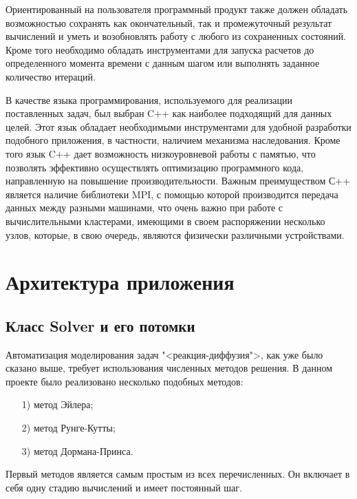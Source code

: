 \documentclass[a4paper, 14pt]{extarticle}
\theoremstyle{definition}
\begin{document}
\par Ориентированный на пользователя программный продукт также должен обладать возможностью сохранять как окончательный, так и промежуточный результат вычислений и уметь и возобновлять работу с любого из сохраненных состояний. Кроме того необходимо обладать инструментами для запуска расчетов до определенного момента времени с данным шагом или выполнять заданное количество итераций.

\par В качестве языка программирования, используемого для реализации поставленных задач, был выбран C++ как наиболее подходящий для данных целей. Этот язык обладает необходимыми инструментами для удобной разработки подобного приложения, в частности, наличием механизма наследования. Кроме того язык C++ дает возможность низкоуровневой работы с памятью, что позволять эффективно осуществлять оптимизацию программного кода, направленную на повышение производительности.  Важным преимуществом С++ является наличие библиотеки MPI, с помощью которой производится передача данных между разными машинами, что очень важно при работе с вычислительными кластерами, имеющими в своем распоряжении несколько узлов, которые, в свою очередь, являются физически различными устройствами.




\section{Архитектура приложения}

\subsection{Класс Solver и его потомки}

\par Автоматизация моделирования задач "<реакция-диффузия">, как уже было сказано выше, требует использования численных методов решения. В данном проекте было реализовано несколько подобных методов:
\begin{enumerate}
\item[1)] метод Эйлера;
\item[2)] метод Рунге-Кутты;
\item[3)] метод Дормана-Принса.
\end{enumerate}

\par Первый методов является самым простым из всех перечисленных. Он включает в себя одну стадию вычислений и имеет постоянный шаг.
\end{document}
